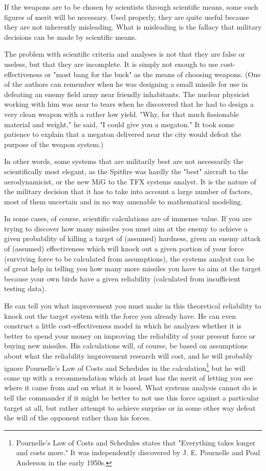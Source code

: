 If the weapons are to be chosen by scientists through scientific means, some such figures of merit will be necessary. Used properly, they are quite useful because they are not inherently misleading. What is misleading is the fallacy that military decisions can be made by scientific means.

The problem with scientific criteria and analyses is not that they are false or useless, but that they are incomplete. It is simply not enough to use cost-effectiveness or "most bang for the buck" as the means of choosing weapons. (One of the authors can remember when he was designing a small missile for use in defeating an enemy field army near friendly inhabitants. The nuclear physicist working with him was near to tears when he discovered that he had to design a very clean weapon with a rather low yield. "Why, for that much fissionable material and weight," he said, "I could give you a megaton." It took some patience to explain that a megaton delivered near the city would defeat the purpose of the weapon system.)

In other words, some systems that are militarily best are not necessarily the scientifically most elegant, as the Spitfire was hardly the "best" aircraft to the aerodynamicist, or the new MiG to the TFX systems analyst. It is the nature of the military decision that it has to take into account a large number of factors, most of them uncertain and in no way amenable to mathematical modeling.

In some cases, of course, scientific calculations are of immense value. If you are trying to discover how many missiles you must aim at the enemy to achieve a given probability of killing a target of (assumed) hardness, given an enemy attack of (assumed) effectiveness which will knock out a given portion of your force (surviving force to be calculated from assumptions), the systems analyst can be of great help in telling you how many more missiles you have to aim at the target because your own birds have a given reliability (calculated from insufficient testing data).

He can tell you what improvement you must make in this theoretical reliability to knock out the target system with the force you already have. He can even construct a little cost-effectiveness model in which he analyzes whether it is better to spend your money on improving the reliability of your present force or buying new missiles. His calculations will, of course, be based on assumptions about what the reliability improvement research will cost, and he will probably ignore Pournelle's Law of Costs and Schedules in the calculation\footnote{Pournelle's Law of Costs and Schedules states that "Everything takes longer and costs more." It was independently discovered by J. E. Pournelle and Poul Anderson in the early 1950s.}  but he will come up with a recommendation which at least has the merit of letting you see where it came from and on what it is based. What systems analysis cannot do is tell the commander if it might be better to not use this force against a particular target at all, but rather attempt to achieve surprise or in some other way defeat the will of the opponent rather than his forces.

